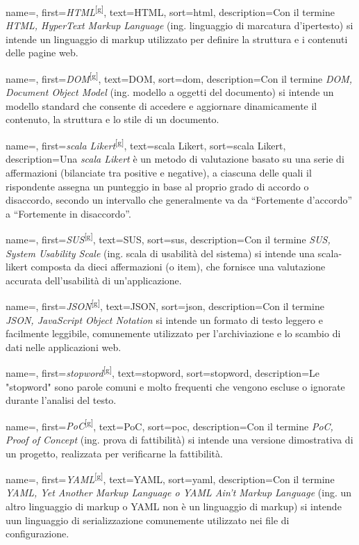  {
    name=,
    first={\textit{HTML}\textsuperscript{[g]}},
    text=HTML,
    sort=html,
    description={Con il termine \emph{HTML, HyperText Markup Language} (ing. linguaggio di marcatura d'ipertesto) si intende un linguaggio di markup utilizzato per definire la struttura e i contenuti delle pagine web.}
}

 {
    name=,
    first={\textit{DOM}\textsuperscript{[g]}},
    text=DOM,
    sort=dom,
    description={Con il termine \emph{DOM, Document Object Model} (ing. modello a oggetti del documento) si intende un modello standard che consente di accedere e aggiornare dinamicamente il contenuto, la struttura e lo stile di un documento.}
}

 {
    name=,
    first={\textit{scala Likert}\textsuperscript{[g]}},
    text=scala Likert,
    sort=scala Likert,
    description={Una \emph{scala Likert} è un metodo di valutazione basato su una serie di affermazioni (bilanciate tra positive e negative), a ciascuna delle quali il rispondente assegna un punteggio in base al proprio grado di accordo o disaccordo, secondo un intervallo che generalmente va da “Fortemente d'accordo” a “Fortemente in disaccordo”.}
}

 {
    name=,
    first={\textit{SUS}\textsuperscript{[g]}},
    text=SUS,
    sort=sus,
    description={Con il termine \emph{SUS, System Usability Scale} (ing. scala di usabilità del sistema) si intende una \gls{scala-likert} composta da dieci affermazioni (o item), che fornisce una valutazione accurata dell'usabilità di un'applicazione.}
}

 {
    name=,
    first={\textit{JSON}\textsuperscript{[g]}},
    text=JSON,
    sort=json,
    description={Con il termine \emph{JSON, JavaScript Object Notation} si intende un formato di testo leggero e facilmente leggibile, comunemente utilizzato per l’archiviazione e lo scambio di dati nelle applicazioni web.}
}

 {
    name=,
    first={\textit{stopword}\textsuperscript{[g]}},
    text=stopword,
    sort=stopword,
    description={Le "stopword" sono parole comuni e molto frequenti che vengono escluse o ignorate durante l’analisi del testo.}
}

 {
    name=,
    first={\textit{PoC}\textsuperscript{[g]}},
    text=PoC,
    sort=poc,
    description={Con il termine \emph{PoC, Proof of Concept} (ing. prova di fattibilità) si intende una versione dimostrativa di un progetto, realizzata per verificarne la fattibilità.}
}

 {
    name=,
    first={\textit{YAML}\textsuperscript{[g]}},
    text=YAML,
    sort=yaml,
    description={Con il termine \emph{YAML, Yet Another Markup Language o YAML Ain’t Markup Language} (ing. un altro linguaggio di markup o YAML non è un linguaggio di markup) si intende uun linguaggio di serializzazione comunemente utilizzato nei file di configurazione.}
}
